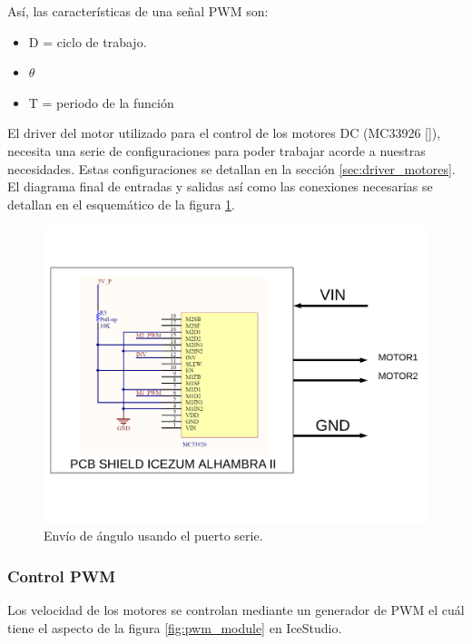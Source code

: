 Así, las características de una señal PWM son: 
\begin{itemize}
	\item D = ciclo de trabajo.
	\item $\theta$
	\item T = periodo de la función
\end{itemize}


El driver del motor utilizado para el control de los motores DC (MC33926 []), necesita una serie de configuraciones para poder trabajar acorde a nuestras necesidades. Estas configuraciones se detallan en la sección \ref{sec:driver_motores}. El diagrama final de entradas y salidas así como las conexiones necesarias se detallan en el esquemático de la figura \ref{fig:driver_motor}.


\begin{figure}[H]
	\center
	\includegraphics[trim = 0mm 3cm 0mm 2cm, clip,scale=0.6]{imagenes/Balancing_robot/driver_motor.pdf}
	\caption{Envío de ángulo usando el puerto serie.}
	\label{fig:driver_motor}
\end{figure}




\subsubsection{Control PWM}

Los velocidad de los motores se controlan mediante un generador de PWM el cuál tiene el aspecto de la figura \ref{fig:pwm_module} en IceStudio. 


